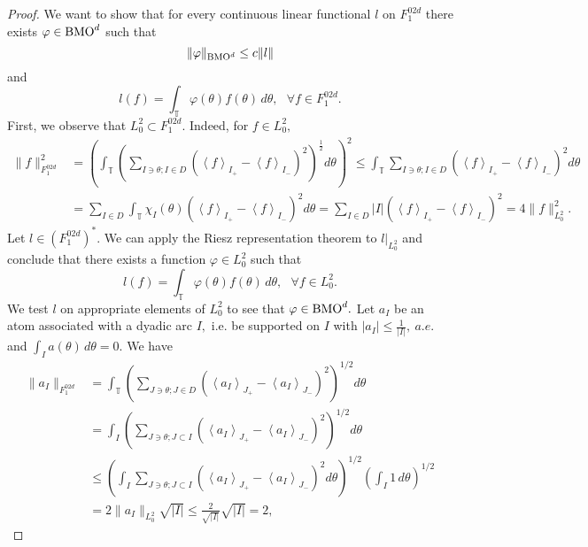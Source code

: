 \documentclass[psamsfonts]{conm-p-l}
\theoremstyle{definition}
\theoremstyle{remark}
\numberwithin{equation}{section}
\begin{document}
\begin{proof} 
We want to show that for every continuous linear functional $l$ on ${F^{02d}_1}$ there exists $\varphi\in {{\rm{BMO}}}^d$ such that
{\begin{equation}\label{d063}{
\|\varphi\|_{{{\rm{BMO}}}^d}\le c\|l\|
}\end{equation}}
and
{\begin{equation}\label{d064}{
l(f)=\int_{\mathbb{T}}\varphi(\theta)f(\theta)\,d\theta,~~~\forall f\in{F^{02d}_1}.
}\end{equation}}
First, we observe that $L^2_0\subset{F^{02d}_1}.$ Indeed, for $f\in L^2_0,$
\begin{align*}
\|f\|^2_{F^{02d}_1}&=\left(\int_\mathbb{T}\left(\sum_{I\ni \theta;I\in D}\left(\left<f\right>_{I_+}-\left<f\right>_{I_-}\right)^2\right)^{\frac12}\!\!\!d\theta\right)^2\le
\int_\mathbb{T}\!\sum_{I\ni \theta;I\in D}\!\!\left(\left<f\right>_{I_+}-\left<f\right>_{I_-}\right)^2\!\!d\theta\\
&=\sum_{I\in D}\int_{\mathbb{T}}\chi_I(\theta)\left(\left<f\right>_{I_+}-\left<f\right>_{I_-}\right)^2d\theta
=\sum_{I\in D}|I|\left(\left<f\right>_{I_+}-\left<f\right>_{I_-}\right)^2=4\|f\|^2_{L^2_0}.
\end{align*}
Let $l\in\left({F^{02d}_1}\right)^*.$ We can apply the Riesz representation theorem to $\left.l\right|_{L^2_0}$ and conclude that there exists a function $\varphi\in L^2_0$ such that 
{\begin{equation}\label{d067}{
l(f)=\int_{\mathbb{T}}\varphi(\theta)f(\theta)\,d\theta,~~~\forall f\in L^2_0.
}\end{equation}}
We test $l$ on appropriate elements of $L^2_0$ to see that $\varphi\in {{\rm{BMO}}}^d.$ Let $a_I$ be an atom associated with a dyadic arc $I,$ i.e. be supported on $I$ with $|a_I|\le\frac1{|I|},~a.e.$ and $\int_I a(\theta)\,d\theta=0.$ We have
\begin{align*}
\|a_I\|_{F^{02d}_1}&=\int_{\mathbb{T}}\left(\sum_{J\ni \theta;J\in D}
\left(\left<a_I\right>_{J_+}-\left<a_I\right>_{J_-}\right)^2\right)^{1/2}d\theta\\
&=\int_I\left(\sum_{J\ni \theta;J\subset I}
\left(\left<a_I\right>_{J_+}-\left<a_I\right>_{J_-}\right)^2\right)^{1/2}d\theta\\
&\le\left(\int_I\sum_{J\ni \theta;J\subset I}
\left(\left<a_I\right>_{J_+}-\left<a_I\right>_{J_-}\right)^2d\theta\right)^{1/2}
\left(\int_I 1\,d\theta\right)^{1/2}\\
&=2\|a_I\|_{L^2_0}\sqrt{|I|}\le\frac2{\sqrt{|I|}}\sqrt{|I|}=2,

\end{align*}
\end{proof}
\end{document}
